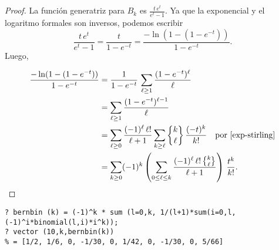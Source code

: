 \documentclass{article}
\begin{document}
\begin{proof}
La función generatriz para $B_k$ es $\frac{t\,e^t}{e^t - 1}$. Ya que la exponencial y el logaritmo formales son inversos, podemos escribir
$$\frac{t\,e^t}{e^t - 1} = \frac{t}{1 - e^{-t}} = \frac{-\ln (1 - (1-e^{-t}))}{1 - e^{-t}}.$$
Luego,

\begin{align*}
\frac{-\ln (1 - (1-e^{-t}))}{1 - e^{-t}} & = \frac{1}{1 - e^{-t}}\,\sum_{\ell \ge 1} \frac{(1 - e^{-t})^\ell}{\ell} \\
 & = \sum_{\ell \ge 1} \frac{(1 - e^{-t})^{\ell-1}}{\ell} \\
 & = \sum_{\ell \ge 0} \frac{(-1)^\ell\,\ell!}{\ell+1} \sum_{k \ge \ell} \Stirling{k}{\ell}\,\frac{(-t)^k}{k!} \quad\text{por \ref{exp-stirling}} \\
 & = \sum_{k \ge 0} (-1)^k \left(\sum_{0\le \ell \le k} \frac{(-1)^\ell\,\ell! \, \Stirling{k}{\ell}}{\ell+1}\right)\,\frac{t^k}{k!}.
\end{align*}
\end{proof}

\begin{shaded}
\small
\begin{verbatim}
? bernbin (k) = (-1)^k * sum (l=0,k, 1/(l+1)*sum(i=0,l, (-1)^i*binomial(l,i)*i^k));
? vector (10,k,bernbin(k))                                                         
% = [1/2, 1/6, 0, -1/30, 0, 1/42, 0, -1/30, 0, 5/66]
\end{verbatim}
\end{shaded}
\end{document}
